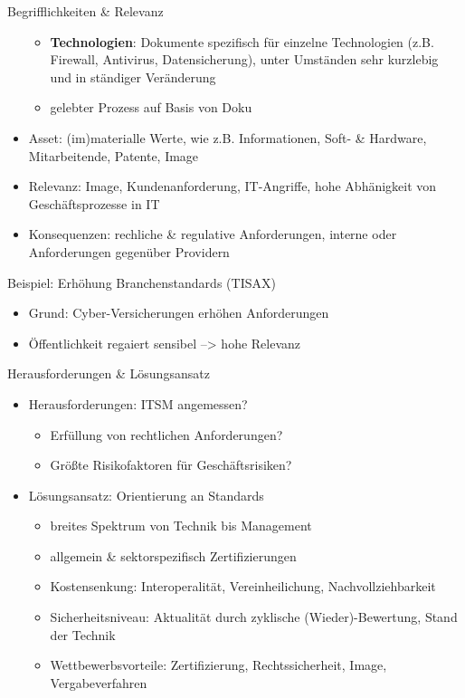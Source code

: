 \documentclass{cheatsheet}
\begin{document}
\begin{sectionbox}{Begrifflichkeiten \& Relevanz}
\begin{itemize}
\begin{itemize}
                \item \textbf{Technologien}: Dokumente spezifisch für einzelne Technologien (z.B. Firewall, Antivirus, Datensicherung), unter Umständen sehr kurzlebig und in ständiger Veränderung
                \item gelebter Prozess auf Basis von Doku
            \end{itemize}
            \item Asset: (im)materialle Werte, wie z.B. Informationen, Soft- \& Hardware, Mitarbeitende, Patente, Image
            \item Relevanz: Image, Kundenanforderung, IT-Angriffe, hohe Abhänigkeit von Geschäftsprozesse in IT
            \item Konsequenzen: rechliche \& regulative Anforderungen, interne oder Anforderungen gegenüber Providern
        \end{itemize}
        \begin{hintbox}{Beispiel: Erhöhung Branchenstandards (TISAX)}
            \begin{itemize}
                \item Grund: Cyber-Versicherungen erhöhen Anforderungen
                \item Öffentlichkeit regaiert sensibel --> hohe Relevanz 
            \end{itemize}
        \end{hintbox}
    \end{sectionbox}
    \begin{sectionbox}{Herausforderungen \& Lösungsansatz}
        \begin{itemize}
            \item Herausforderungen: ITSM angemessen?
            \begin{itemize}
                \item Erfüllung von rechtlichen Anforderungen? 
                \item Größte Risikofaktoren für Geschäftsrisiken?
            \end{itemize}
            \item Lösungsansatz: Orientierung an Standards
            \begin{itemize}
                \item breites Spektrum von Technik bis Management
                \item allgemein \& sektorspezifisch Zertifizierungen 
                \item Kostensenkung: Interoperalität, Vereinheilichung, Nachvollziehbarkeit
                \item Sicherheitsniveau: Aktualität durch zyklische (Wieder)-Bewertung, Stand der Technik
                \item Wettbewerbsvorteile: Zertifizierung, Rechtssicherheit, Image, Vergabeverfahren
            \end{itemize}
        \end{itemize}
    \end{sectionbox}
\end{document}

